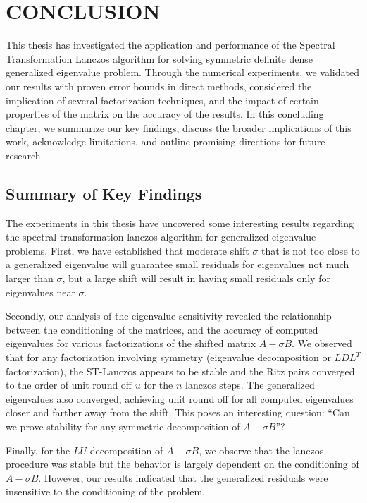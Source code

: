 \chapter{CONCLUSION}
This thesis has investigated the application and performance of the Spectral Transformation Lanczos algorithm for solving symmetric definite dense generalized eigenvalue problem. Through the numerical experiments, we validated our results with proven error bounds in direct methods, considered the implication of several factorization techniques, and the impact of certain properties of the matrix on the accuracy of the results. In this concluding chapter, we summarize our key findings, discuss the broader implications of this work, acknowledge limitations, and outline promising directions for future research.

\section{Summary of Key Findings}
The experiments in this thesis have uncovered some interesting results regarding the spectral transformation lanczos algorithm for generalized eigenvalue problems. First, we have established that moderate shift $\sigma$ that is not too close to a generalized eigenvalue will guarantee small residuals for eigenvalues not much larger than $\sigma$, but a large shift will result in having small residuals only for eigenvalues near $\sigma$.

Secondly, our analysis of the eigenvalue sensitivity revealed the relationship between the conditioning of the matrices, and the accuracy of computed eigenvalues for various factorizations of the shifted matrix $A-\sigma B$. We observed that for any factorization involving symmetry (eigenvalue decomposition or $LDL^T$ factorization), the ST-Lanczos appears to be stable and the Ritz pairs converged to the order of unit round off $u$ for the $n$ lanczos steps. The generalized eigenvalues also converged, achieving unit round off for all computed eigenvalues closer and farther away from the shift. This poses an interesting question: ``Can we prove stability for any symmetric decomposition of $A - \sigma B$''?

Finally, for the $LU$ decomposition of $A - \sigma B$, we observe that the lanczos procedure was stable but the behavior is largely dependent on the conditioning of $A-\sigma B$. However, our results indicated that the generalized residuals were insensitive to the conditioning of the problem.

